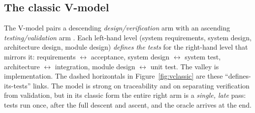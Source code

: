 \documentclass[11pt,a4paper]{article}
\begin{document}
\subsection{The classic V-model}

The V-model pairs a descending \emph{design/verification} arm with an ascending
\emph{testing/validation} arm \cite{qmsdoc2026,sheridan2026b}. Each left-hand level
(system requirements, system design, architecture design, module design) \emph{defines
the tests} for the right-hand level that mirrors it: requirements $\leftrightarrow$
acceptance, system design $\leftrightarrow$ system test, architecture
$\leftrightarrow$ integration, module design $\leftrightarrow$ unit test. The valley is
implementation. The dashed horizontals in Figure~\ref{fig:vclassic} are these
``defines-its-tests'' links. The model is strong on traceability and on separating
verification from validation, but in its classic form the entire right arm is a
\emph{single, late} pass: tests run once, after the full descent and ascent, and the
oracle arrives at the end.
\end{document}
